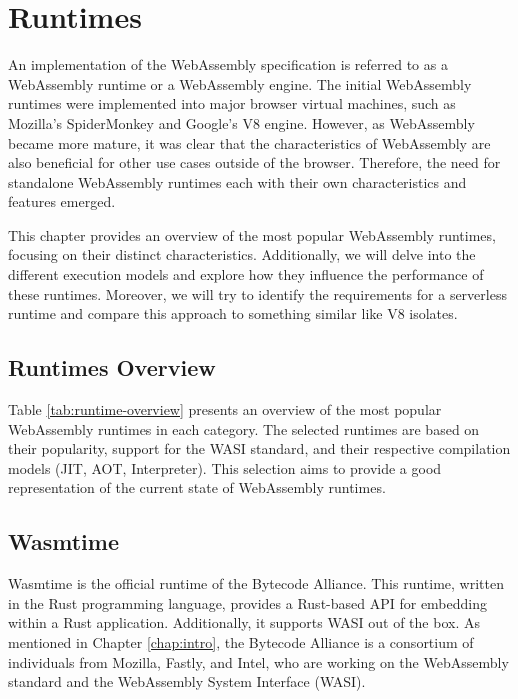 \chapter{Runtimes}
\label{chap:runtimes}

An implementation of the WebAssembly specification \cite{webassemblycommunitygroup_2023_webassembly} is referred to as a WebAssembly runtime or a WebAssembly engine. The initial WebAssembly runtimes were implemented into major browser virtual machines, such as Mozilla's SpiderMonkey and Google's V8 engine. However, as WebAssembly became more mature, it was clear that the characteristics of WebAssembly are also beneficial for other use cases outside of the browser. Therefore, the need for standalone WebAssembly runtimes each with their own characteristics and features emerged. 

This chapter provides an overview of the most popular WebAssembly runtimes, focusing on their distinct characteristics. Additionally, we will delve into the different execution models and explore how they influence the performance of these runtimes. Moreover, we will try to identify the requirements for a \gls{serverless} runtime and compare this approach to something similar like V8 isolates. 

\section{Runtimes Overview}
\label{sec:runtimes-overview}

Table \ref{tab:runtime-overview} presents an overview of the most popular WebAssembly runtimes in each category. The selected runtimes are based on their popularity, support for the WASI standard, and their respective compilation models (JIT, AOT, Interpreter). This selection aims to provide a good representation of the current state of WebAssembly runtimes. 



\section{Wasmtime}
\label{sec:wasmtime}

Wasmtime \cite{bytecodealliance_2022_wasmtime} is the official runtime of the Bytecode Alliance. This runtime, written in the Rust programming language, provides a Rust-based API for embedding within a Rust application. Additionally, it supports WASI out of the box. As mentioned in Chapter \ref{chap:intro}, the Bytecode Alliance is a consortium of individuals from Mozilla, Fastly, and Intel, who are working on the WebAssembly standard and the WebAssembly System Interface (WASI).


